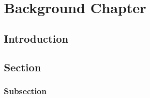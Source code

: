 \chapter{Background Chapter}

\section{Introduction}

\lipsum[1-4]

\section{Section}

\lipsum[2-4]

\subsection{Subsection}

\lipsum[2-4]